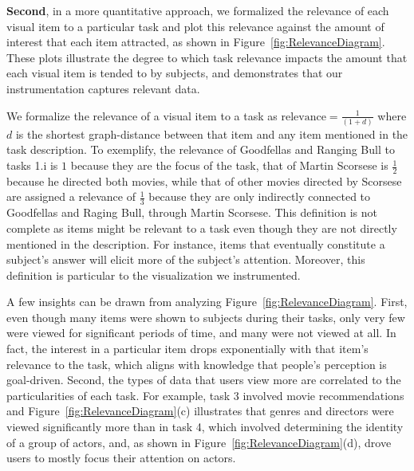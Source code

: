 \textbf{Second}, in a more quantitative approach, we formalized the relevance of each visual item to a particular task and plot this relevance against the amount of interest that each item attracted, as shown in Figure~\ref{fig:RelevanceDiagram}. These plots illustrate the degree to which task relevance impacts the amount that each visual item is tended to by subjects, and demonstrates that our instrumentation captures relevant data.  

We formalize the relevance of a visual item to a task as $\text{relevance} = \frac{1}{(1+d)}$ where $d$ is the shortest graph-distance between that item and any item mentioned in the task description.  To exemplify, the relevance of Goodfellas and Ranging Bull to tasks 1.i is $1$ because they are the focus of the task, that of Martin Scorsese is $\frac{1}{2}$ because he directed both movies, while that of other movies directed by Scorsese are assigned a relevance of $\frac{1}{3}$ because they are only indirectly connected to Goodfellas and Raging Bull, through Martin Scorsese. This definition is not complete as items might be relevant to a task even though they are not directly mentioned in the description.  For instance, items that eventually constitute a subject's answer will elicit more of the subject's attention. Moreover, this definition is particular to the visualization we instrumented.

A few insights can be drawn from analyzing Figure~\ref{fig:RelevanceDiagram}. First, even though many items were shown to subjects during their tasks, only very few were viewed for significant periods of time, and many were not viewed at all. In fact, the interest in a particular item drops exponentially with that item's relevance to the task, which aligns with knowledge that people's perception is goal-driven.  Second, the types of data that users view more are correlated to the particularities of each task. For example, task 3 involved movie recommendations and Figure~\ref{fig:RelevanceDiagram}(c) illustrates that genres and directors were viewed significantly more than in task 4, which involved determining the identity of a group of actors, and, as shown in  Figure~\ref{fig:RelevanceDiagram}(d), drove users to mostly focus their attention on actors. 




